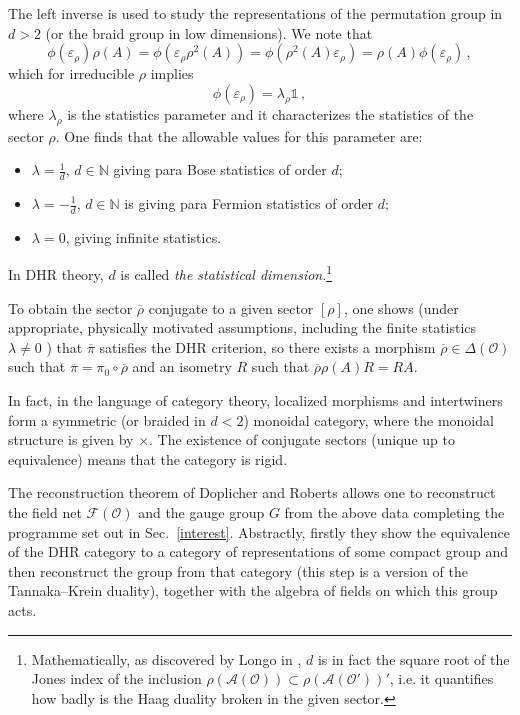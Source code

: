 \documentclass[12pt]{article}
\newcommand{\1}{\mathds{1}}                         %
\newcommand{\NN}{\mathbb{N}}          %
\newcommand{\F}{\mathcal{F}}
\newcommand{\Ocal}{\mathcal{O}}
\newcommand{\Ac}{{\mathcal{A}}}
\begin{document}
The left inverse is used to study the representations of the permutation
group in $d>2$ (or the braid group in low dimensions). We note that
\[
\phi(\varepsilon_\rho)\rho(A)=\phi(\varepsilon_\rho\rho^2(A))=\phi(\rho^2(A)\varepsilon_\rho)=\rho(A)\phi(\varepsilon_\rho)\,,
\]
which for irreducible $\rho$ implies
\[
\phi(\varepsilon_\rho)=\lambda_\rho \1\,,
\]
where $\lambda_\rho$ is the statistics parameter and it characterizes the statistics of the sector $\rho$.  One finds that the allowable values for this parameter are:  
\begin{itemize}
\item $\lambda=\frac{1}{d}$, $d\in\NN$ giving para Bose statistics of order $d$;
\item $\lambda=-\frac{1}{d}$, $d\in\NN$ is giving para Fermion statistics of order $d$; 
\item $\lambda=0$, giving infinite statistics. 
\end{itemize}
In DHR theory, $d$ is called \emph{the statistical dimension}.\footnote{Mathematically, as discovered by Longo in \cite{Lon89}, $d$ is in fact the square root  of the Jones index of the inclusion $\rho(\Ac(\Ocal))\subset\rho(\Ac(\Ocal'))'$, i.e. it quantifies how badly is the Haag duality broken in the given sector.}

To obtain the sector $\overline{\rho}$ conjugate to a given sector $[\rho]$, one shows (under appropriate, physically motivated assumptions, including the finite statistics $\lambda\neq 0$ \cite{DHR3}) that $\overline{\pi}$ satisfies the DHR criterion, so there exists a  morphism $\overline{\rho}\in \Delta(\Ocal)$ such that $\overline{\pi}=\pi_0\circ \overline{\rho}$ and an isometry $R$ such that $\overline{\rho}\rho(A) R= RA$.


In fact, in the language of category theory, localized morphisms and intertwiners form a symmetric (or braided in $d<2$) monoidal category, where the monoidal structure is given by $\times$. The existence of conjugate sectors (unique up to equivalence) means that the category is rigid.

 The reconstruction theorem of Doplicher and Roberts \cite{DR89} allows one to reconstruct the field net $\F(\Ocal)$ and the gauge group $G$ from the above data completing the programme set out in Sec.~\ref{interest}. Abstractly, firstly they show the equivalence of the DHR category to a category of representations of some compact group and then reconstruct the group from that category (this step is a version of the Tannaka--Krein duality), together with the algebra of fields on which this group acts.
\end{document}
